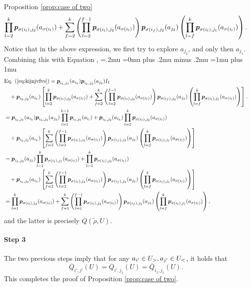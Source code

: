 \begin{proofof}{Proposition \ref{prop:case of two}}
\[
\prod_{l=2}^{k} \boldsymbol{ p }_{{\sigma (i_l)},{j_2}}(a_{\sigma (i_l)})+\sum_{f=2}^{k} \left(\prod_{l=2}^{f-1} \boldsymbol{ p }_{{\sigma (i_l)},{j_2}}(a_{\sigma (i_l)})\right) \boldsymbol{ p }_{{\sigma (i_f)},{j_2}}(a_{j_2}) \left(\prod_{l=f}^{k} \boldsymbol{ p }_{{\sigma (i_l)},{j_1}}(a_{\sigma (i_l)})\right).
\]
Notice that in the above expression, we first try to explore $a_{j_2}$, and only then $a_{j_1}$. Combining this with Equation ,
{\thinmuskip=.2mu
\medmuskip=0mu plus .2mu minus .2mu
\thickmuskip=1mu plus 1mu
\begin{align*}
&\textnormal{Eq. } \refeq{eq:kijnjvfvs}=\bl p_{i_k,j_1}(a_{i_k})\bl p_{i_k,j_2}(a_{j_2})I_1\\
&\quad + \bl p_{i_k,j_2}(a_{i_k})\left[\prod_{l=2}^{k} \bl p_{{\sigma (i_l)},{j_2}}(a_{\sigma (i_l)})+\sum_{f=2}^{k} \left(\prod_{l=2}^{f-1} \bl p_{{\sigma (i_l)},{j_2}}(a_{\sigma (i_l)})\right) \bl p_{{\sigma (i_f)},{j_2}}(a_{j_2}) \left(\prod_{l=f}^{k} \bl p_{{\sigma (i_l)},{j_1}}(a_{\sigma (i_l)})\right) \right]. \\
&= \bl p_{i_k,j_1}(a_{i_k})\bl p_{i_k,j_2}(a_{j_2})\prod_{l=1}^{k-1} \bl p_{{i_l},{j_1}}(a_{i_l})+\bl p_{i_k,j_2}(a_{i_k})\prod_{l=2}^{k} \bl p_{{\sigma (i_l)},{j_2}}(a_{\sigma (i_l)})\\
&\quad + \bl p_{i_k,j_2}(a_{i_k})\left[\sum_{f=2}^{k} \left(\prod_{l=2}^{f-1} \bl p_{{\sigma (i_l)},{j_2}}(a_{\sigma (i_l)})\right) \bl p_{{\sigma (i_f)},{j_2}}(a_{j_2}) \left(\prod_{l=f}^{k} \bl p_{{\sigma (i_l)},{j_1}}(a_{\sigma (i_l)})\right) \right]\\
&=\bl p_{i_k,j_2}(a_{j_2})\prod_{l=1}^{k} \bl p_{{\sigma(i_l)},{j_1}}(a_{\sigma(i_l)})+\prod_{l=1}^{k} \bl p_{{\sigma (i_l)},{j_2}}(a_{\sigma (i_l)})\\
&\quad + \bl p_{i_k,j_2}(a_{i_k})\left[\sum_{f=2}^{k} \left(\prod_{l=2}^{f-1} \bl p_{{\sigma (i_l)},{j_2}}(a_{\sigma (i_l)})\right) \bl p_{{\sigma (i_f)},{j_2}}(a_{j_2}) \left(\prod_{l=f}^{k} \bl p_{{\sigma (i_l)},{j_1}}(a_{\sigma (i_l)})\right) \right]\\
&=\prod_{l=1}^{k} \bl p_{{\sigma (i_l)},{j_2}}(a_{\sigma (i_l)})+\sum_{f=1}^{k} \left(\prod_{l=1}^{f-1} \bl p_{{\sigma (i_l)},{j_2}}(a_{\sigma (i_l)})\right) \bl p_{{\sigma (i_f)},{j_2}}(a_{j_2}) \left(\prod_{l=f}^{k} \bl p_{{\sigma (i_l)},{j_1}}(a_{\sigma (i_l)})\right), 
\end{align*}}%
and the latter is precisely $\overline Q(\tilde \rho, U)$.
\paragraph{Step 3}
The two previous steps imply that for any $a_{i'}\in U_>, a_{j'}\in U_<$, it holds that
\[
\overline Q_{i',j'}(U)=\overline Q_{i',j_1}(U)= \overline Q_{i_1,j_1}(U).
\]
This completes the proof of Proposition \ref{prop:case of two}.
\end{proofof}
